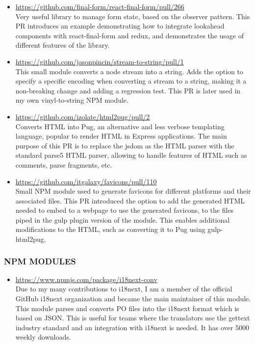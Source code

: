 \documentclass{res}
\begin{document}
\begin{resume}
\begin{itemize}
  \item \url{https://github.com/final-form/react-final-form/pull/266} \\
  Very useful library to manage form state, based on the observer pattern.
  This PR introduces an example demonstrating how to integrate lookahead components
  with react-final-form and redux, and demonstrates the usage of different
  features of the library.

  \item \url{https://github.com/jasonpincin/stream-to-string/pull/1} \\
  This small module converts a node stream into a string.
  Adds the option to specify a specific encoding when converting a stream to
  a string, making it a non-breaking change and adding a regression test.
  This PR is later used in my own vinyl-to-string NPM module.

  \item \url{https://github.com/izolate/html2pug/pull/2} \\
  Converts HTML into Pug, an alternative and less verbose templating language,
  popular to render HTML in Express applications. The main purpose of this PR
  is to replace the jsdom as the HTML parser with the standard parse5 HTML
  parser, allowing to handle features of HTML such as comments, parse fragments,
  etc.

  \item \url{https://github.com/itgalaxy/favicons/pull/110} \\
  Small NPM module used to generate favicons for different platforms and their
  associated files. This PR introduced the option to add the generated HTML
  needed to embed to a webpage to use the generated favicons, to the files piped
  in the gulp plugin version of the module. This enables additional modifications
  to the HTML, such as converting it to Pug using gulp-html2pug.
\end{itemize}

\subsubsection{NPM MODULES}

\begin{itemize}
  \item \url{https://www.npmjs.com/package/i18next-conv} \\
  Due to my many contributions to i18next, I am a member of the official
  GitHub i18next organization and became the main maintainer of this module.
  This module parses and converts PO files into the i18next format which
  is based on JSON. This is useful for teams where the translators use
  the gettext industry standard and an integration with i18next is needed.
  It has over 5000 weekly downloads.


\end{itemize}
\end{resume}
\end{document}

